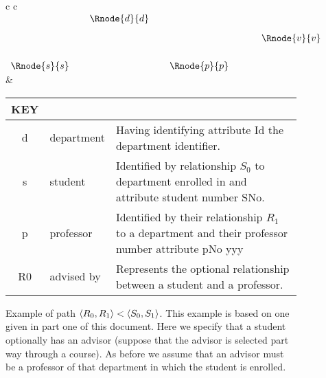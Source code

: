 \documentclass[10pt,a4paper]{article}
\begin{document}
\begin{figure} [H]  %
\begin{center}
\begin{tabular}{c c}
$
\begin{array}{cp{0.05cm}c  p{0.05cm}c p{0.5cm}c}
                & & \Rnode{d}{d} & &              & &             \\ [0.3cm]
								& &              & &              & & \Rnode{v}{v} \\ [0.6cm]     
	 \Rnode{s}{s} & &              & & \Rnode{p}{p} & &             
\end{array}
$
\idcomp
{} 
\idcomp
{} 
\idcomp
{} 
\idcomp
{} 
\idcomp
& \footnotesize
\begin{tabular}{c p{1.5cm} p{4cm}}
KEY && \\
\hline
d & department & Having identifying attribute Id the department identifier. \\
s & student & Identified by relationship $S_0$ to department enrolled in and  attribute student number SNo. \\
p & professor & Identified by their relationship $R_1$ to a department and their professor number attribute pNo yyy \\
R0 & advised by & Represents the optional relationship between a student and a professor.\\
\end{tabular} 
\end{tabular}
\end{center}
\caption{Example of path  $\langle R_0,R_1\rangle < \langle S_0,S_1\rangle$. This example is based on one given in part one of this document. Here we specify that a student optionally has an advisor (suppose that the advisor is selected part way through a course). As before we assume that an advisor must be a professor of that department
in which the student is enrolled. }
\label{studentadvisorgraph}
\end{figure}
\end{document}

